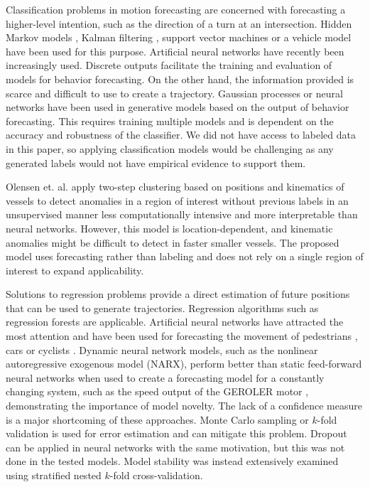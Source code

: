 \documentclass[preprint,12pt]{elsarticle}
\begin{document}
Classification problems in motion forecasting are concerned with forecasting a higher-level intention, such as the direction of a turn at an intersection. Hidden Markov models \citep{tay2012probabilistic, streubel2014prediction}, Kalman filtering \citep{carvalho2014stochastic}, support vector machines \citep{mandalia2005using, kumar2013learning} or a vehicle model \citep{houenou2013vehicle} have been used for this purpose. Artificial neural networks \citep{yoon2016multilayer, khosroshahi2016surround, phillips2017generalizable} have recently been increasingly used. Discrete outputs facilitate the training and evaluation of models for behavior forecasting. On the other hand, the information provided is scarce and difficult to use to create a trajectory. Gaussian processes \citep{tay2012probabilistic} or neural networks \citep{yoon2016multilayer} have been used in generative models based on the output of behavior forecasting. This requires training multiple models and is dependent on the accuracy and robustness of the classifier. We did not have access to labeled data in this paper, so applying classification models would be challenging as any generated labels would not have empirical evidence to support them.

Olensen et. al. \cite{olesen2023contextually} apply two-step clustering based on positions and kinematics of vessels to detect anomalies in a region of interest without previous labels in an unsupervised manner less computationally intensive and more interpretable than neural networks. However, this model is location-dependent, and kinematic anomalies might be difficult to detect in faster smaller vessels. The proposed model uses forecasting rather than labeling and does not rely on a single region of interest to expand applicability.

Solutions to regression problems provide a direct estimation of future positions that can be used to generate trajectories. Regression algorithms such as regression forests \citep{volz2016predicting} are applicable. Artificial neural networks have attracted the most attention and have been used for forecasting the movement of pedestrians \citep{duan2016travel, alahi2016social}, cars \citep{tomar2012safety, liu2014vehicle} or cyclists \citep{zernetsch2016trajectory}. Dynamic neural network models, such as the nonlinear autoregressive exogenous model (NARX), perform better than static feed-forward neural networks when used to create a forecasting model for a constantly changing system, such as the speed output of the GEROLER motor \citep{gregov2022modeling}, demonstrating the importance of model novelty. The lack of a confidence measure is a major shortcoming of these approaches. Monte Carlo sampling or $k$-fold validation \citep{fushiki2011estimation} is used for error estimation and can mitigate this problem. Dropout can be applied in neural networks \citep{gal2016dropout} with the same motivation, but this was not done in the tested models. Model stability was instead extensively examined using stratified nested $k$-fold cross-validation.
\end{document}
